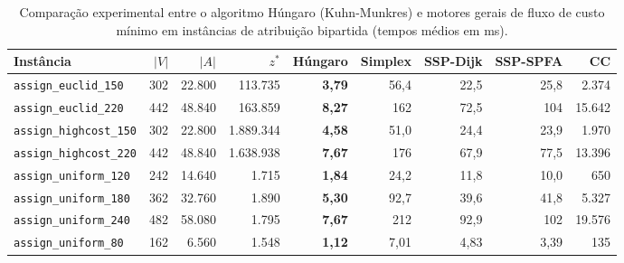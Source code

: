 \begin{table}[!ht]
\centering
\small
\setlength{\tabcolsep}{3.5pt}
\begin{tabular}{lrrrrrrrr}
\toprule
\textbf{Instância} & $|V|$ & $|A|$ & $z^*$ & \textbf{Húngaro} & \textbf{Simplex} & \textbf{SSP-Dijk} & \textbf{SSP-SPFA} & \textbf{CC} \\
\midrule
\texttt{assign\_euclid\_150} & 302 & 22.800 & 113.735 & \textbf{3,79} & 56,4 & 22,5 & 25,8 & 2.374 \\
\texttt{assign\_euclid\_220} & 442 & 48.840 & 163.859 & \textbf{8,27} & 162 & 72,5 & 104 & 15.642 \\
\texttt{assign\_highcost\_150} & 302 & 22.800 & 1.889.344 & \textbf{4,58} & 51,0 & 24,4 & 23,9 & 1.970 \\
\texttt{assign\_highcost\_220} & 442 & 48.840 & 1.638.938 & \textbf{7,67} & 176 & 67,9 & 77,5 & 13.396 \\
\texttt{assign\_uniform\_120} & 242 & 14.640 & 1.715 & \textbf{1,84} & 24,2 & 11,8 & 10,0 & 650 \\
\texttt{assign\_uniform\_180} & 362 & 32.760 & 1.890 & \textbf{5,30} & 92,7 & 39,6 & 41,8 & 5.327 \\
\texttt{assign\_uniform\_240} & 482 & 58.080 & 1.795 & \textbf{7,67} & 212 & 92,9 & 102 & 19.576 \\
\texttt{assign\_uniform\_80} & 162 & 6.560 & 1.548 & \textbf{1,12} & 7,01 & 4,83 & 3,39 & 135 \\
\bottomrule
\end{tabular}
\caption{Comparação experimental entre o algoritmo Húngaro (Kuhn-Munkres) e motores gerais de fluxo de custo mínimo em instâncias de atribuição bipartida (tempos médios em ms).}
\label{tab:benchmarks_bipartite_assignment}
\end{table}
